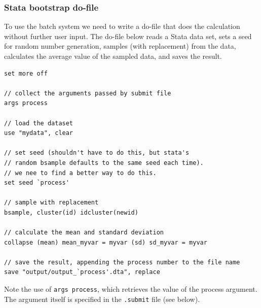 \documentclass[11pt]{article}
\begin{document}
\subsubsection{Stata bootstrap do-file}
\label{sec:org4f91316}
To use the batch system we need to write a do-file that does the calculation without further user input. The do-file below reads a Stata data set, sets a seed for random number generation, samples (with replacement) from the data, calculates the average value of the sampled data, and saves the result.
\begin{verbatim}
set more off

// collect the arguments passed by submit file
args process

// load the dataset
use "mydata", clear

// set seed (shouldn't have to do this, but stata's
// random bsample defaults to the same seed each time).
// we nee to find a better way to do this.
set seed `process'

// sample with replacement
bsample, cluster(id) idcluster(newid)

// calculate the mean and standard deviation
collapse (mean) mean_myvar = myvar (sd) sd_myvar = myvar

// save the result, appending the process number to the file name
save "output/output_`process'.dta", replace
\end{verbatim}
Note the use of \texttt{args process}, which retrieves the value of the process argument. The argument itself is specified in the \texttt{.submit} file (see below).
\end{document}

